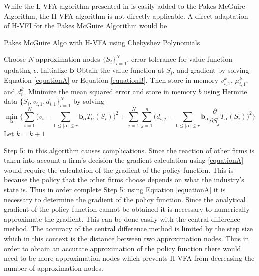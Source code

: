 \documentclass[12pt]{article}
\newcommand{\norm}[1]{\left\lVert#1\right\rVert}
\begin{document}
While the L-VFA algorithm presented in \citet{2015_Judd_Cai} is easily added to the Pakes McGuire Algorithm, the H-VFA algorithm is not directly applicable. A direct adaptation of H-VFI for the Pakes McGuire Algorithm would be

\begin{algorithm}[H]
  \caption{Pakes McGuire Algo with H-VFA using Chebyshev Polynomials}
  \begin{algorithmic}[1]
    \Procedure{}{} Choose $N$ approximation nodes $\{S_i\}_{i=1}^N$, error tolerance for value function updating $\epsilon$.
    \State Initialize $\boldsymbol{b}$
    \While{$\norm{\hat{V}^{k}_1-\hat{V}^{k-1}_1} > \frac{\epsilon (1-\beta)}{2\beta}$}
    \State Obtain the value function at $S_i$, and gradient by solving Equation \eqref{equationA} or Equation \eqref{equationB}. Then store in memory $v^k_{i,1}$, $\mu^k_{i,1}$, and $d_{i}^k$.
    \State Minimize the mean squared error and store in memory $b$ using Hermite data $\{S_i,v_{i,1},d_{i,1}\}_{i=1}^N$ by solving
\begin{equation*}
  \min_{\boldsymbol{b}} \Bigg \{\sum_{i=1}^N \bigg (v_i-\sum_{0\leq |\alpha|\leq r}\boldsymbol{b}_\alpha T_\alpha(S_i) \bigg )^2+\sum_{i=1}^N \sum_{j=1}^{n} \bigg ( d_{i,j} - \sum_{0\leq |\alpha|\leq r}\boldsymbol{b}_\alpha \frac{\partial}{\partial S_j}T_\alpha(S_i) \bigg )^2 \Bigg \}
\end{equation*}
    \State Let $k=k+1$
    \EndFor
    \EndWhile
    \EndProcedure
  \end{algorithmic}
\end{algorithm}

Step 5: in this algorithm causes complications. Since the reaction of other firms is taken into account a firm's decision the gradient calculation using \eqref{equationA} would require the calculation of the gradient of the policy function. This is because the policy that the other firms choose depends on what the industry's state is. Thus in order complete Step 5: using Equation \eqref{equationA} it is necessary to determine the gradient of the policy function. Since the analytical gradient of the policy function cannot be obtained it is necessary to numerically approximate the gradient. This can be done easily with the central difference method. The accuracy of the central difference method is limited by the step size which in this context is the distance between two approximation nodes. Thus in order to obtain an accurate approximation of the policy function there would need to be more approximation nodes which prevents H-VFA from decreasing the number of approximation nodes.
\end{document}
